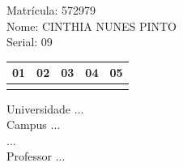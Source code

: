 \documentclass[10pt,a4paper,twocolumn]{report}
\begin{document}
Matrícula: 572979\\ Nome: CINTHIA NUNES PINTO \\ Serial: 09\\
\begin{tabular}{|l|l|l|l|l|}\hline
01  &02  &03  &04  &05 \\ \hline 
 & & & & \\ \hline 
\end{tabular}
 \cleardoublepage 

\begin{flushleft}
Universidade ...\\
Campus ...\\
...\\
Professor ...\\
\end{flushleft}
\end{document}
